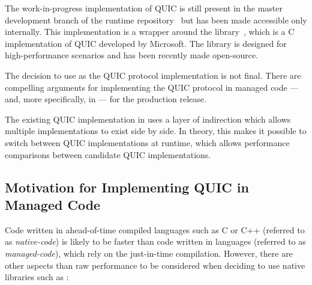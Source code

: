 The work-in-progress implementation of QUIC is still present in the master development branch of the
\dotnet{} runtime repository~\cite{dotnetGithub} but has been made accessible only internally. This
implementation is a wrapper around the \libmsquic{} library~\cite{msquicGithub}, which is a C
implementation of QUIC developed by Microsoft. The \libmsquic{} library is designed for
high-performance scenarios and has been recently made open-source.

The decision to use \libmsquic{} as the QUIC protocol implementation is not final. There are
compelling arguments for implementing the QUIC protocol in managed \dotnet{} code --- and, more
specifically, in \csharp{} --- for the production release.

The existing QUIC implementation in \dotnet{} uses a layer of indirection which allows multiple
implementations to exist side by side. In theory, this makes it possible to switch between QUIC
implementations at runtime, which allows performance comparisons between candidate QUIC
implementations.

\subsection*{Motivation for Implementing QUIC in Managed Code}

Code written in ahead-of-time compiled languages such as C or C++ (referred to as
\textit{\gls{native-code}}) is likely to be faster than code written in \dotnet{} languages
(referred to as \textit{\gls{managed-code}}), which rely on the just-in-time compilation. However,
there are other aspects than raw performance to be considered when deciding to use native libraries
such as \libmsquic{}:


